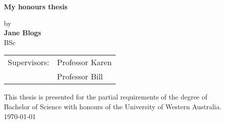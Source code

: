 
\vspace*{0.4cm}
\begin{center}
{ \huge \bfseries My honours thesis  \\[0.4cm] }
\vspace{1cm}
\end{center}
\begin{center}
\large
by\\
\vspace{1.5cm}
\textbf{Jane Blogs}\\
BSc\\
\vspace{1cm}
\end{center}
\vspace{3cm}

\begin{tabular}{ p{2.2cm}l } 
Supervisors: & Professor Karen\\
			&  Professor Bill
\end{tabular}

\vfill
\begin{center}
This thesis is presented for the partial requirements of the degree of\\ Bachelor of Science with honours
of the University of Western Australia.\\
\today
\end{center}
\vspace{2.5cm}